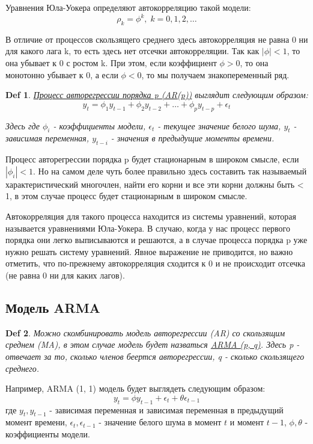 \documentclass{article}
\newtheorem*{definition}{Def}
\begin{document}
Уравнения Юла-Уокера определяют автокорреляцию такой модели: $$\rho_k = \phi^k, \; k = 0, 1, 2, \dots$$

В отличие от процессов скользящего среднего здесь автокорреляция не равна 0 ни для какого лага k, то есть здесь нет отсечки автокорреляции. Так как $|\phi| < 1$, то она убывает к 0 с ростом k. При этом, если коэффициент $\phi > 0$, то она монотонно убывает к 0, а если $\phi < 0$, то мы получаем знакопеременный ряд.

\begin{definition}
    \underline{Процесс авторегрессии порядка p (AR(p))} выглядит следующим образом: 
$$y_t = \phi_1 y_{t-1} +  \phi_2 y_{t-2} + \dots +  \phi_ p y_{t-p} + \epsilon_{t} $$

Здесь где $\phi_i$ - коэффициенты модели, $\epsilon_{t}$ - текущее значение белого шума, $y_t$ - зависимая переменная, $y_{t-i} $ - значения в предыдущие моменты времени.
\end{definition}
 

Процесс авторегрессии порядка p будет стационарным в широком смысле, если $|\phi_i| < 1$. Но на самом деле чуть более правильно здесь составить так называемый характеристический многочлен, найти его корни и все эти корни должны быть < 1, в этом случае процесс будет стационарным в широком смысле.

Автокорреляция для такого процесса находится из системы уравнений, которая называется уравнениями Юла-Уокера. В случаю, когда у нас процесс первого порядка они легко выписываются и решаются, а в случае процесса порядка p уже нужно решать систему уравнений. Явное выражение не приводится, но важно отметить, что по-прежнему автокорреляция сходится к 0 и не происходит отсечка (не равна 0 ни для каких лагов). 

\subsection{Модель ARMA}

\begin{definition}
    Можно скомбинировать модель авторегрессии (AR) со скользящим среднем (MA), в этом случае модель будет назваться \underline{ARMA (p, q)}. Здесь p - отвечает за то, сколько членов беертся авторегрессии, q - сколько скользящего среднего.  
\end{definition}

Например, ARMA (1, 1) модель будет выглядеть следующим образом: 
$$y_t = \phi y_{t-1} + \epsilon_{t} + \theta \epsilon_{t-1}$$
где $y_t, y_{t-1}$ - зависимая переменная и зависимая переменная в предыдущий момент времени, $\epsilon_{t}, \epsilon_{t-1}$ - значение белого шума в момент $t$ и момент $t-1$, $\phi, \theta$ - коэффициенты модели. 
\end{document}
